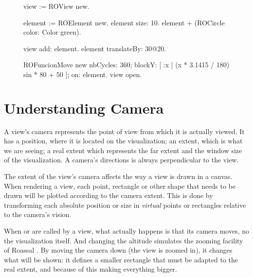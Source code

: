 \documentclass[a4paper,10pt,twoside]{book}
\begin{document}
\begin{figure}[H]
\begin{code}{}
view := ROView new.

element := ROElement new.
element size: 10.
element + (ROCircle color: Color green).

view add: element.
element translateBy: 30@20.

ROFuncionMove new
	nbCycles: 360;
	blockY: [ :x | (x * 3.1415 / 180) sin * 80 + 50 ];
	on: element.
view open.
\end{code}
\label{animationCode}
\end{figure}




\section{Understanding Camera} 

A view's camera represents the point of view from which it is actually viewed. It has a position, where it is located on the visualization; an extent, which is what we are seeing; a real extent which represents the far extent and the window size of the visualization. A camera's directions is always perpendicular to the view. 


The extent of the view's camera affects the way a view is drawn in a canvas. When rendering a view, each point, rectangle or other shape that needs to be drawn will be plotted according to the camera extent. This is done by transforming each absolute position or size in \emph{virtual} points or rectangles relative to the camera's vision.

When  or  are called by a view, what actually happens is that its camera moves, no the visualization itself. And changing the altitude simulates the zooming facility of Roassal . By moving the camera down (\ie the view is zoomed in), it changes what will be shown: it defines a smaller rectangle that must be adapted to the real extent, and because of this making everything bigger.%
\end{document}
